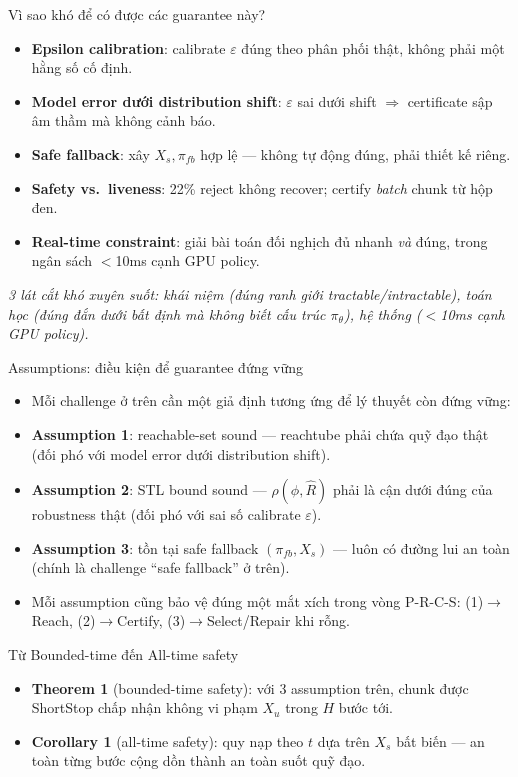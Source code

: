 \documentclass[aspectratio=169]{beamer}
\begin{document}
\begin{frame}[t,shrink=8]{Vì sao khó để có được các guarantee này?}
\begin{itemize}
    \item \textbf{Epsilon calibration}: calibrate $\varepsilon$ đúng theo phân phối thật, không phải một hằng số cố định.
    \item \textbf{Model error dưới distribution shift}: $\varepsilon$ sai dưới shift $\Rightarrow$ certificate sập âm thầm mà không cảnh báo.
    \item \textbf{Safe fallback}: xây $X_s,\pi_{fb}$ hợp lệ --- không tự động đúng, phải thiết kế riêng.
    \item \textbf{Safety vs.\ liveness}: 22\% reject không recover; certify \emph{batch} chunk từ hộp đen.
    \item \textbf{Real-time constraint}: giải bài toán đối nghịch đủ nhanh \emph{và} đúng, trong ngân sách $<$10ms cạnh GPU policy.
\end{itemize}
\vspace{4pt}
\textit{3 lát cắt khó xuyên suốt: khái niệm (đúng ranh giới tractable/intractable), toán học (đúng đắn dưới bất định mà không biết cấu trúc $\pi_\theta$), hệ thống ($<$10ms cạnh GPU policy).}
\end{frame}

\begin{frame}[t,shrink=8]{Assumptions: điều kiện để guarantee đứng vững}
\begin{itemize}
    \item Mỗi challenge ở trên cần một giả định tương ứng để lý thuyết còn đứng vững:
    \item \textbf{Assumption 1}: reachable-set sound --- reachtube phải chứa quỹ đạo thật (đối phó với model error dưới distribution shift).
    \item \textbf{Assumption 2}: STL bound sound --- $\rho(\phi,\hat R)$ phải là cận dưới đúng của robustness thật (đối phó với sai số calibrate $\varepsilon$).
    \item \textbf{Assumption 3}: tồn tại safe fallback $(\pi_{fb}, X_s)$ --- luôn có đường lui an toàn (chính là challenge ``safe fallback'' ở trên).
    \item Mỗi assumption cũng bảo vệ đúng một mắt xích trong vòng P-R-C-S: (1)$\to$Reach, (2)$\to$Certify, (3)$\to$Select/Repair khi rỗng.
\end{itemize}
\end{frame}

\begin{frame}[t,shrink=8]{Từ Bounded-time đến All-time safety}
\begin{itemize}
    \item \textbf{Theorem 1} (bounded-time safety): với 3 assumption trên, chunk được ShortStop chấp nhận không vi phạm $X_u$ trong $H$ bước tới.
    \item \textbf{Corollary 1} (all-time safety): quy nạp theo $t$ dựa trên $X_s$ bất biến --- an toàn từng bước cộng dồn thành an toàn suốt quỹ đạo.
\end{itemize}
\end{frame}
\end{document}
